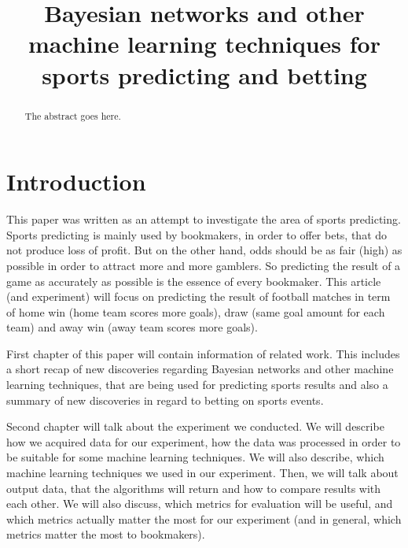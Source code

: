 \documentclass[conference]{IEEEtran}
\begin{document}
\title{Bayesian networks and other machine learning techniques for sports predicting and betting}

\author{
}


\maketitle

\begin{abstract}
The abstract goes here.
\end{abstract}

\IEEEpeerreviewmaketitle

\section{Introduction}

This paper was written as an attempt to investigate the area of sports predicting.
Sports predicting is mainly used by bookmakers, in order to offer bets, that do 
not produce loss of profit. But on the other hand, odds should be as fair (high) as possible
in order to attract more and more gamblers. So predicting the result of a game as accurately
as possible is the essence of every bookmaker. This article (and experiment) will focus on 
predicting the result of football matches in term of home win (home team scores more goals),
draw (same goal amount for each team) and away win (away team scores more goals).

First chapter of this paper will contain information of related work. This includes a short recap
of new discoveries regarding Bayesian networks and
other machine learning techniques, that are being used for predicting sports results and also a summary of 
new discoveries in regard to betting on sports events.

Second chapter will talk about the experiment we conducted. We will describe how we acquired 
data for our experiment, how the data was processed in order to be suitable for some machine 
learning techniques. We will also describe, which machine learning techniques we used in our experiment.
Then, we will talk about output data, that the algorithms will return and how to compare
results with each other. We will also discuss, which metrics for evaluation will be useful,
and which metrics actually matter the most for our experiment (and in general, which metrics
matter the most to bookmakers).
\end{document}
